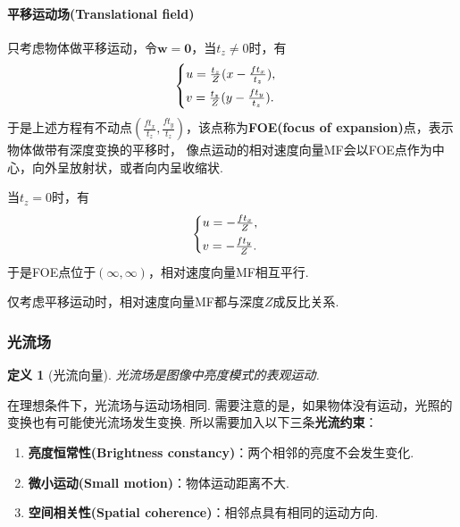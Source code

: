 \documentclass[12pt, a4paper, oneside]{ctexart}
\newtheorem{definition}{定义}
\numberwithin{equation}{section}  %
\theoremstyle{definition}
\def\bd{\boldsymbol}        %
\def\add{\vspace{1ex}}      %
\begin{document}
\paragraph{平移运动场(Translational field)}
只考虑物体做平移运动，令$\bd{w} = \bd{0}$，当$t_z\neq 0$时，有
\begin{equation*}
    \begin{cases}
        u = \frac{t_z}{Z}(x-\frac{ft_x}{t_z}),\add\\
        v = \frac{t_z}{Z}(y-\frac{ft_y}{t_z}).
    \end{cases}
\end{equation*}
于是上述方程有不动点$(\frac{ft_x}{t_z}, \frac{ft_y}{t_z})$，该点称为\textbf{FOE(focus of expansion)}点，表示物体做带有深度变换的平移时，
像点运动的相对速度向量MF会以FOE点作为中心，向外呈放射状，或者向内呈收缩状.

当$t_z = 0 $时，有
\begin{equation*}
    \begin{cases}
        u = -\frac{ft_x}{Z},\add\\
        v = -\frac{ft_y}{Z}.
    \end{cases}
\end{equation*}
于是FOE点位于$(\infty, \infty)$，相对速度向量MF相互平行.

仅考虑平移运动时，相对速度向量MF都与深度$Z$成反比关系.
\subsubsection{光流场}
\begin{definition}[光流向量]
    光流场是图像中亮度模式的表观运动.
\end{definition}
在理想条件下，光流场与运动场相同. 需要注意的是，如果物体没有运动，光照的变换也有可能使光流场发生变换. 所以需要加入以下三条\textbf{光流约束}：
\begin{enumerate}
    \item \textbf{亮度恒常性(Brightness constancy)}：两个相邻的亮度不会发生变化.
    \item \textbf{微小运动(Small motion)}：物体运动距离不大.
    \item \textbf{空间相关性(Spatial coherence)}：相邻点具有相同的运动方向.
\end{enumerate}
\end{document}
